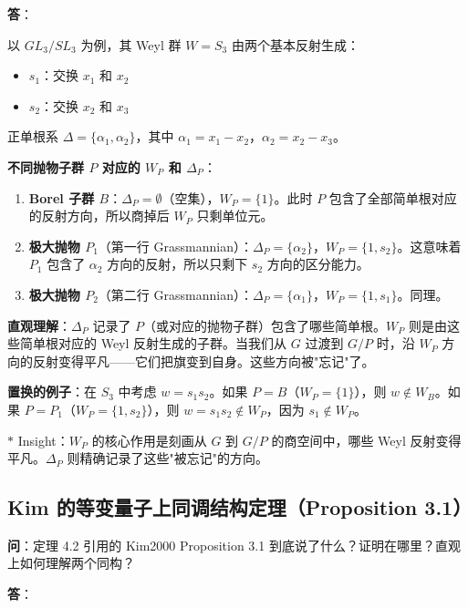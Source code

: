 \textbf{答}：

以 $GL_3 / SL_3$ 为例，其 Weyl 群 $W = S_3$ 由两个基本反射生成：
\begin{itemize}
\item $s_1$：交换 $x_1$ 和 $x_2$
\item $s_2$：交换 $x_2$ 和 $x_3$
\end{itemize}

正单根系 $\Delta = \{\alpha_1, \alpha_2\}$，其中 $\alpha_1 = x_1 - x_2$，$\alpha_2 = x_2 - x_3$。

\textbf{不同抛物子群 $P$ 对应的 $W_P$ 和 $\Delta_P$}：

\begin{enumerate}
\item \textbf{Borel 子群 $B$}：$\Delta_P = \emptyset$（空集），$W_P = \{1\}$。此时 $P$ 包含了全部简单根对应的反射方向，所以商掉后 $W_P$ 只剩单位元。

\item \textbf{极大抛物 $P_1$}（第一行 Grassmannian）：$\Delta_P = \{\alpha_2\}$，$W_P = \{1, s_2\}$。这意味着 $P_1$ 包含了 $\alpha_2$ 方向的反射，所以只剩下 $s_2$ 方向的区分能力。

\item \textbf{极大抛物 $P_2$}（第二行 Grassmannian）：$\Delta_P = \{\alpha_1\}$，$W_P = \{1, s_1\}$。同理。
\end{enumerate}

\textbf{直观理解}：$\Delta_P$ 记录了 $P$（或对应的抛物子群）包含了哪些简单根。$W_P$ 则是由这些简单根对应的 Weyl 反射生成的子群。当我们从 $G$ 过渡到 $G/P$ 时，沿 $W_P$ 方向的反射变得平凡——它们把旗变到自身。这些方向被"忘记"了。

\textbf{置换的例子}：在 $S_3$ 中考虑 $w = s_1 s_2$。如果 $P = B$（$W_P = \{1\}$），则 $w \notin W_B$。如果 $P = P_1$（$W_P = \{1, s_2\}$），则 $w = s_1 s_2 \notin W_P$，因为 $s_1 \notin W_P$。

$*$ Insight：$W_P$ 的核心作用是刻画从 $G$ 到 $G/P$ 的商空间中，哪些 Weyl 反射变得平凡。$\Delta_P$ 则精确记录了这些"被忘记"的方向。

\subsection{Kim 的等变量子上同调结构定理（Proposition 3.1）}\label{sec:qa-KimStructureTheorem}

\textbf{问}：定理 4.2 引用的 Kim2000 Proposition 3.1 到底说了什么？证明在哪里？直观上如何理解两个同构？

\textbf{答}：


